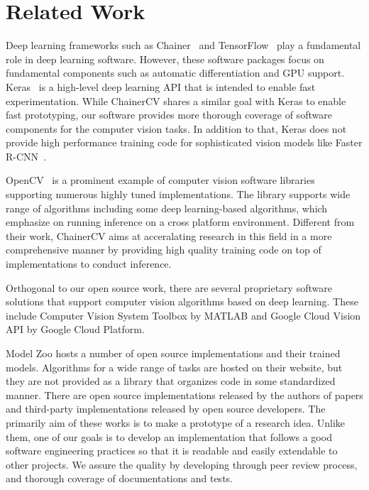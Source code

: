 \documentclass[sigconf]{acmart}
\begin{document}
\section{Related Work}

Deep learning frameworks such as Chainer~\cite{Tokui2015} and TensorFlow~\cite{tensorflow2015-whitepaper} play a fundamental role in deep learning software.
However, these software packages focus on fundamental components such as automatic differentiation and GPU support.
Keras~\cite{chollet2015keras} is a high-level deep learning API that is intended to enable fast experimentation.
While ChainerCV shares a similar goal with Keras to enable fast prototyping, our software provides more thorough coverage of software components for the computer vision tasks.
In addition to that, Keras does not provide high performance training code for sophisticated vision models like Faster R-CNN~\cite{Ren2015}.


OpenCV~\cite{itseez2015opencv} is a prominent example of computer vision software libraries supporting numerous highly tuned implementations.
The library supports wide range of algorithms including some deep learning-based algorithms, which emphasize on running inference on a cross platform environment.
Different from their work, ChainerCV aims at acceralating research in this field in a more comprehensive manner by
providing high quality training code on top of implementations to conduct inference.

Orthogonal to our open source work, there are several proprietary software solutions that support computer vision algorithms based on deep learning.
These include Computer Vision System Toolbox by MATLAB and Google Cloud Vision API by Google Cloud Platform.

Model Zoo hosts a number of open source implementations and their trained models.
Algorithms for a wide range of tasks are hosted on their website, but they are not provided as a library that organizes code in some standardized manner.
There are open source implementations released by the authors of papers and third-party implementations released by open source developers.
The primarily aim of these works is to make a prototype of a research idea.
Unlike them, one of our goals is to develop an implementation that follows a good software engineering practices so that
it is readable and easily extendable to other projects.
We assure the quality by developing through peer review process, and thorough coverage of documentations and tests.
\end{document}
